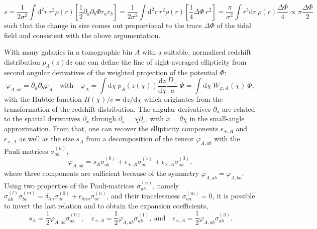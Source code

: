 \documentclass[a4paper,fleqn,usenatbib]{mnras}
\newcommand{\dd}{\mathrm{d}}
\begin{document}
\begin{equation}
s = 
\frac{1}{2\sigma^2}\int\dd^2r\:r^2\rho(r)\left[\frac{1}{2}\partial_a\partial_b\Phi r_ar_b\right] =
\frac{1}{2\sigma^2}\int\dd^2r\:r^2\rho(r)\left[\frac{1}{4}\Delta\Phi\:r^2\right] = 
\frac{\pi}{\sigma^2}\int r^5\dd r\:\rho(r)\frac{\Delta\Phi}{4} \propto \pi\frac{\Delta\Phi}{2}
\end{equation}
such that the change in size comes out proportional to the trace $\Delta\Phi$ of the tidal field and consistent with the above argumentation.

With many galaxies in a tomographic bin $A$ with a suitable, normalised redshift distribution $p_A(z)\dd z$ one can define the line of sight-averaged ellipticity from second angular derivatives of the weighted projection of the potential $\Phi$:
\begin{equation}
\varphi_{A,ab} = \partial_a\partial_b\varphi_A
\quad\mathrm{with}\quad
\varphi_A = \int\dd\chi\:p_A(z(\chi))\frac{\dd z}{\dd\chi}\frac{D_+}{a}\:\Phi = \int\dd\chi\:W_{\varphi,A}(\chi)\:\Phi,
\end{equation}
with the Hubble-function $H(\chi)/c = \dd z/\dd\chi$ which originates from the transformation of the redshift distribution. The angular derivatives $\partial_a$ are related to the spatial derivatives $\partial_x$ through $\partial_a = \chi\partial_x$, with $x=\theta\chi$ in the small-angle approximation. From that, one can recover the ellipticity components $\epsilon_{+,A}$ and $\epsilon_{\times,A}$ as well as the size $s_A$ from a decomposition of the tensor $\varphi_{A,ab}$ with the Pauli-matrices $\sigma_{ab}^{(n)}$,
\begin{equation}
\varphi_{A,ab} = s_A\sigma^{(0)}_{ab} + \epsilon_{+,A}\sigma^{(1)}_{ab} + \epsilon_{\times,A}\sigma^{(3)}_{ab},
\end{equation}
where three components are sufficient because of the symmetry $\varphi_{A,ab} = \varphi_{A,ba}$. Using two properties of the Pauli-matrices $\sigma_{ab}^{(n)}$, namely $\sigma_{ab}^{(l)}\sigma_{bc}^{(m)} = \delta_{lm}\sigma^{(0)}_{ac} + \epsilon_{lmn}\sigma^{(n)}_{ac}$, and their tracelessness $\sigma^{(m)}_{aa} = 0$, it is possible to invert the last relation and to obtain the expansion coefficients,
\begin{equation}
s_A = \frac{1}{2}\varphi_{A,ab}\sigma^{(0)}_{ab},
\quad
\epsilon_{+,A} = \frac{1}{2}\varphi_{A,ab}\sigma^{(1)}_{ab},
\mathrm{~and}\quad
\epsilon_{\times,A} = \frac{1}{2}\varphi_{A,ab}\sigma^{(3)}_{ab}.
\end{equation}
\end{document}
